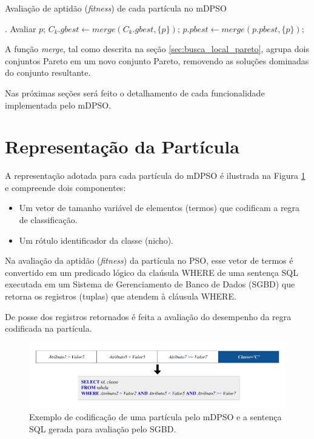\documentclass[
	12pt,				%
	openany,			%
	oneside,	
	a4paper,			%
	brazil,				%
	]{unimontes-ppgmsc-abntex2}
\begin{document}
\begin{algorithm}[ht]
\caption{Avaliação de aptidão ({\em fitness}) de cada partícula no mDPSO}
\label{alg:pseudo_mdpso_aval}
\begin{algorithmic}[1]
.
      \State Avaliar $p$;
      \State $C_k.gbest \leftarrow merge(C_k.gbest, \{p\})$;
      \State $p.pbest \leftarrow merge(p.pbest, \{p\})$;
  \EndFor
\end{algorithmic}
\end{algorithm}

A função {\em merge}, tal como descrita na seção \ref{sec:busca_local_pareto}, agrupa dois conjuntos Pareto em um novo conjunto Pareto, removendo as soluções dominadas do conjunto resultante.

Nas próximas seções será feito o detalhamento de cada funcionalidade implementada pelo mDPSO.


\section{Representação da Partícula}
\label{sec:mdpso_repr_part}

A representação adotada para cada partícula do mDPSO é ilustrada na Figura \ref{fig:representacao} e compreende dois componentes:

\begin{itemize}
\item Um vetor de tamanho variável de elementos (termos) que codificam a regra de classificação.
\item Um rótulo identificador da classe (nicho).
\end{itemize}

Na avaliação da aptidão ({\em fitness}) da partícula no PSO, esse vetor de termos é convertido em um predicado lógico da claúsula WHERE de uma sentença SQL executada em um Sistema de Gerenciamento de Banco de Dados (SGBD) que retorna os registros (tuplas) que atendem à cláusula WHERE. 

De posse dos registros retornados é feita a avaliação do desempenho da regra codificada na partícula.

\begin{figure}[ht]
\centering
\includegraphics[scale=.5]{img/representacao}
\caption{Exemplo de codificação de uma partícula pelo mDPSO e a sentença SQL gerada para avaliação pelo SGBD.}
\label{fig:representacao}
\end{figure}
\end{document}
